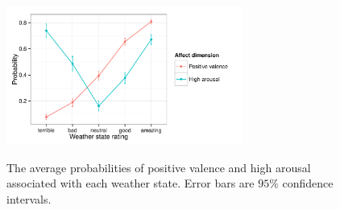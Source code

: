\documentclass[10pt,letterpaper]{article}
\begin{document}



\begin{figure}
\includegraphics[width=220pt, height=150pt]{affect-prior.pdf}
\caption{The average probabilities of positive valence and high arousal associated with each weather state. Error bars are $95\%$ confidence intervals.}
\label{affect-prior}
\end{figure}
\end{document}

